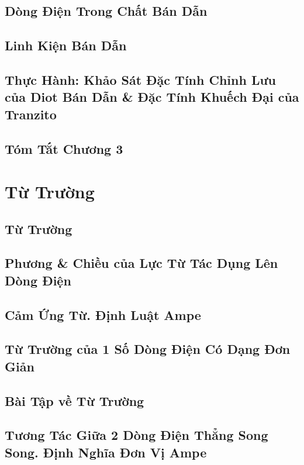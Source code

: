 \documentclass[oneside]{book}
\numberwithin{equation}{section}
\begin{document}
\section{Dòng Điện Trong Chất Bán Dẫn}

\section{Linh Kiện Bán Dẫn}

\section{Thực Hành: Khảo Sát Đặc Tính Chỉnh Lưu của Diot Bán Dẫn \& Đặc Tính Khuếch Đại của Tranzito}

\section{Tóm Tắt Chương 3}


\chapter{Từ Trường}

\section{Từ Trường}

\section{Phương \& Chiều của Lực Từ Tác Dụng Lên Dòng Điện}

\section{Cảm Ứng Từ. Định Luật Ampe}

\section{Từ Trường của 1 Số Dòng Điện Có Dạng Đơn Giản}

\section{Bài Tập về Từ Trường}

\section{Tương Tác Giữa 2 Dòng Điện Thẳng Song Song. Định Nghĩa Đơn Vị Ampe}
\end{document}
